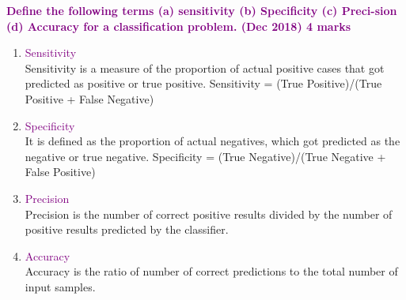 \textbf{\textcolor{purple}{  Define the following terms (a) sensitivity (b) Specificity (c) Preci-sion (d) Accuracy for a classification problem. (Dec 2018) \hfill 4 marks}} \\[5pt]
 \begin{enumerate}
     \item  \textcolor{purple} {Sensitivity} \\   
     Sensitivity is a measure of the proportion of actual positive cases that got predicted as positive or true positive. 
    Sensitivity = (True Positive)/(True Positive + False Negative)
    
    \item \textcolor{purple} {Specificity} \\ 
    It is defined as the proportion of actual negatives, which got predicted as the negative or true negative.
    Specificity = (True Negative)/(True Negative + False Positive)
    
    \item \textcolor{purple} {Precision} \\
    Precision is the number of correct positive results divided by the number of positive results predicted by the classifier.
    
    \item \textcolor{purple} {Accuracy} \\Accuracy is the ratio of number of correct predictions to the total number of input samples.
 \end{enumerate}
